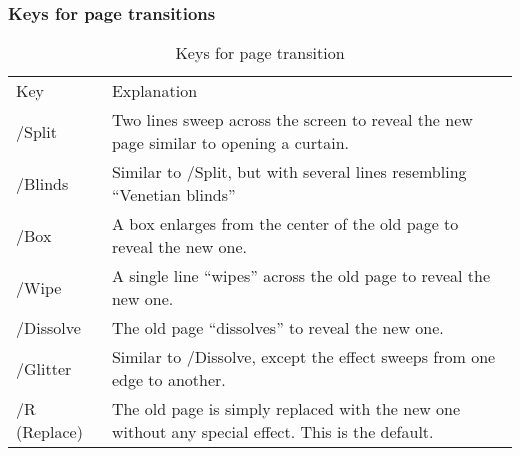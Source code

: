\documentclass[a4paper]{article}
\begin{document}
\subsubsection*{Keys for page transitions}
\def\dash{\noalign{\vskip1.5pt}\hline\noalign{\vskip1.5pt}}
\begin{screen}
\begin{table}[b]
\sffamily\itshape\footnotesize
\setlength\arrayrulewidth{0pt}
\begin{tabular}{@{}p{.15\linewidth}p{.8\linewidth}@{}}
\rowcolor{section1}Key           & Explanation\\\dash
\rowcolor{gray9} /Split          & Two lines sweep across the screen to reveal
                                   the new page similar to opening a curtain.\\\dash
\rowcolor{buttondisable} /Blinds & Similar to /Split, but with several lines
                                   resembling  ``Venetian blinds''\\\dash
\rowcolor{gray9} /Box            & A box enlarges from the center of the old
                                   page to reveal the new one.\\\dash
\rowcolor{buttondisable} /Wipe   & A single line ``wipes'' across the old page
                                   to reveal the new  one.\\\dash
\rowcolor{gray9} /Dissolve       & The old page ``dissolves'' to reveal the
                                   new one.\\\dash
\rowcolor{buttondisable} /Glitter& Similar to /Dissolve, except the effect
                                   sweeps from one edge to another.\\\dash
\rowcolor{gray9} /R (Replace)    & The old page is simply replaced with
                                   the new one without any special effect.
                                   This is the default. 
\end{tabular}
\caption{Keys for page transition\label{tab1}}
\end{table}
\end{screen}
\end{document}
